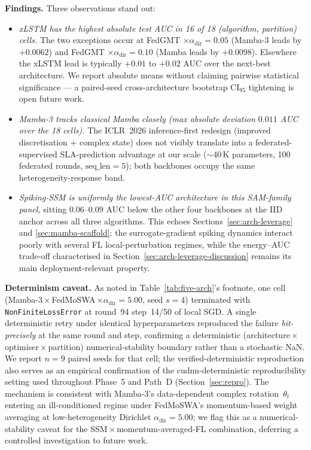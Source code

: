 \documentclass[journal]{IEEEtran}
\newcommand{\alphadir}{\ensuremath{\alpha_{\mathrm{dir}}}}
\begin{document}
\textbf{Findings.} Three observations stand out:
\begin{itemize}
\item \emph{xLSTM has the highest absolute test AUC in 16 of 18 (algorithm, partition) cells.} The two exceptions occur at FedGMT $\times\alphadir{=}0.05$ (Mamba-3 leads by $+0.0062$) and FedGMT $\times\alphadir{=}0.10$ (Mamba leads by $+0.0098$). Elsewhere the xLSTM lead is typically $+0.01$ to $+0.02$ AUC over the next-best architecture. We report absolute means without claiming pairwise statistical significance --- a paired-seed cross-architecture bootstrap CI$_{95}$ tightening is open future work.
\item \emph{Mamba-3 tracks classical Mamba closely (max absolute deviation $0.011$ AUC over the 18 cells).} The ICLR~2026 inference-first redesign (improved discretisation $+$ complex state) does not visibly translate into a federated-supervised SLA-prediction advantage at our scale (${\sim}$40\,K parameters, 100 federated rounds, $\mathrm{seq\_len}{=}5$); both backbones occupy the same heterogeneity-response band.
\item \emph{Spiking-SSM is uniformly the lowest-AUC architecture in this SAM-family panel,} sitting $0.06$--$0.09$ AUC below the other four backbones at the IID anchor across all three algorithms. This echoes Sections~\ref{sec:arch-leverage} and \ref{sec:mamba-scaffold}: the surrogate-gradient spiking dynamics interact poorly with several FL local-perturbation regimes, while the energy--AUC trade-off characterised in Section~\ref{sec:arch-leverage-discussion} remains its main deployment-relevant property.
\end{itemize}

\textbf{Determinism caveat.} As noted in Table~\ref{tab:five-arch}'s footnote, one cell (Mamba-3\,$\times$\,FedMoSWA\,$\times\alphadir{=}5.00$, seed $s{=}4$) terminated with \texttt{NonFiniteLossError} at round~94 step~14/50 of local SGD. A single deterministic retry under identical hyperparameters reproduced the failure \emph{bit-precisely} at the same round and step, confirming a deterministic (architecture\,$\times$\,optimiser\,$\times$\,partition) numerical-stability boundary rather than a stochastic NaN. We report $n{=}9$ paired seeds for that cell; the verified-deterministic reproduction also serves as an empirical confirmation of the cudnn-deterministic reproducibility setting used throughout Phase~5 and Path~D (Section~\ref{sec:repro}). The mechanism is consistent with Mamba-3's data-dependent complex rotation~$\theta_t$ entering an ill-conditioned regime under FedMoSWA's momentum-based weight averaging at low-heterogeneity Dirichlet $\alphadir{=}5.00$; we flag this as a numerical-stability caveat for the SSM\,$\times$\,momentum-averaged-FL combination, deferring a controlled investigation to future work.
\end{document}
